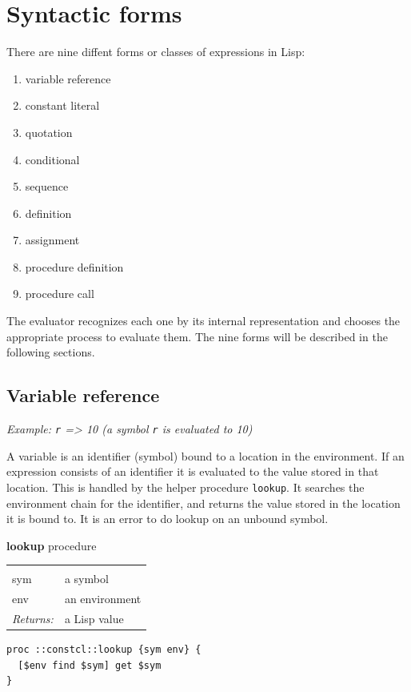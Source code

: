 \documentclass[twoside,9pt]{report}
\begin{document}
\section{Syntactic forms}
\label{syntactic-forms}


There are nine diffent forms or classes of expressions in Lisp:

\begin{enumerate}
\item  variable reference
\item  constant literal
\item  quotation
\item  conditional
\item  sequence
\item  definition
\item  assignment
\item  procedure definition
\item  procedure call
\end{enumerate}


The evaluator recognizes each one by its internal representation and chooses the appropriate process to evaluate them. The nine forms will be described in the following sections.

\subsection{Variable reference}
\label{variable-reference}


\emph{Example: \texttt{r} => 10 (a symbol \texttt{r} is evaluated to 10)}


A variable is an identifier (symbol) bound to a location in the environment. If an expression consists of an identifier it is evaluated to the value stored in that location. This is handled by the helper procedure \texttt{lookup}. It searches the environment chain for the identifier, and returns the value stored in the location it is bound to. It is an error to do lookup on an unbound symbol.


\textbf{lookup} procedure

\noindent\begin{tabular}{ |p{1.5cm} p{8cm}| }
\hline
\rowcolor[HTML]{CCCCCC} \multicolumn{2}{|l|}{\bf lookup (internal)} \\
sym & a symbol \\
env & an environment \\
\textit{Returns:} & a Lisp value \\
\hline
\end{tabular}
\begin{lstlisting}
proc ::constcl::lookup {sym env} {
  [$env find $sym] get $sym
}
\end{lstlisting}
\end{document}
